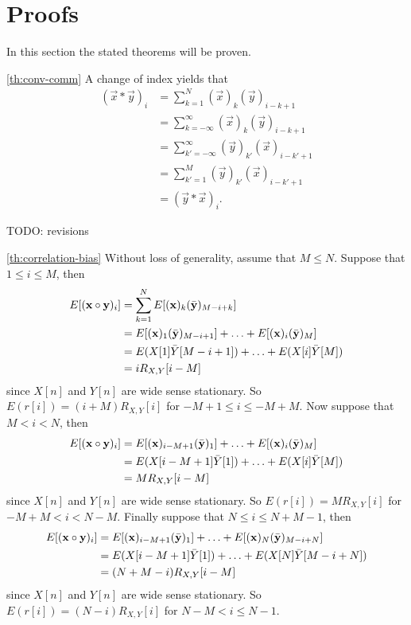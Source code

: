 \documentclass[a4paper, openany, oneside]{memoir}
\begin{document}
\section{Proofs}
\label{sec:proofs}
In this section the stated theorems will be proven.

\begin{blockProofTheorem}{\ref{th:conv-comm}}
    A change of index yields that
    \begin{align*}
        (\vec{x} \ast \vec{y})_i &= \sum_{k=1}^{N} (\vec{x})_k (\vec{y})_{i-k+1} \\
        &= \sum_{k=-\infty}^{\infty} (\vec{x})_k (\vec{y})_{i-k+1} \\
        &= \sum_{k'=-\infty}^{\infty} (\vec{y})_{k'} (\vec{x})_{i-k'+1} \\
        &= \sum_{k'=1}^{M} (\vec{y})_{k'} (\vec{x})_{i-k'+1} \\
        &= (\vec{y} \ast \vec{x})_i.
    \end{align*}
\end{blockProofTheorem}

TODO: revisions

\begin{blockProofTheorem}{\ref{th:correlation-bias}}
    Without loss of generality, assume that $M \le N$. Suppose that $1 \le i \le M$, then
    \begin{align*}
        E[(\boldsymbol{\mathbf{x}} \circ \boldsymbol{\mathbf{y}})_i] &= \sum_{k=1}^N E[(\boldsymbol{\mathbf{x}})_k (\bar{\boldsymbol{\mathbf{y}}
        })_{M-i+k}] \\
        &= E[(\boldsymbol{\mathbf{x}})_1 (\bar{\boldsymbol{\mathbf{y}}})_{M-i+1}] + \ldots + E[(\boldsymbol{\mathbf{x}})_i (\bar{\boldsymbol{\mathbf{y}}})_{M}] \\
        &= E(X[1] \bar{Y}[M-i+1]) + \ldots + E(X[i] \bar{Y}[M])  \\
        &= i R_{X,Y}[i-M]
    \end{align*}
    since $X[n]$ and $Y[n]$ are wide sense stationary. So $E(r[i])=(i+M)R_{X,Y}[i]$ for $-M + 1\le i \le -M+M$. Now suppose that $M < i < N$, then
    \begin{align*}
        E[(\boldsymbol{\mathbf{x}} \circ \boldsymbol{\mathbf{y}})_i] &= E[(\boldsymbol{\mathbf{x}})_{i-M+1} (\bar{\boldsymbol{\mathbf{y}}})_{1}] + \ldots + E[(\boldsymbol{\mathbf{x}})_i (\bar{\boldsymbol{\mathbf{y}}})_{M}] \\
        &= E(X[i-M+1] \bar{Y}[1]) + \ldots + E(X[i] \bar{Y}[M]) \\  
        &= M R_{X,Y}[i-M]
    \end{align*}
    since $X[n]$ and $Y[n]$ are wide sense stationary. So $E(r[i])=M R_{X,Y}[i]$ for $-M+M<i<N-M$. Finally suppose that $N \le i \le N +M - 1$, then
    \begin{align*}
        E[(\boldsymbol{\mathbf{x}} \circ \boldsymbol{\mathbf{y}})_i] &= E[(\boldsymbol{\mathbf{x}})_{i-M+1} (\bar{\boldsymbol{\mathbf{y}}})_{1}] + \ldots + E[(\boldsymbol{\mathbf{x}})_N (\bar{\boldsymbol{\mathbf{y}}})_{M-i+N}] \\
        &= E(X[i-M+1] \bar{Y}[1]) + \ldots + E(X[N] \bar{Y}[M-i+N]) \\
        &= (N+M-i) R_{X,Y}[i-M]
    \end{align*}
    since $X[n]$ and $Y[n]$ are wide sense stationary. So $E(r[i])=(N-i)R_{X,Y}[i]$ for $N-M<i\le N-1$.
\end{blockProofTheorem}
\end{document}
